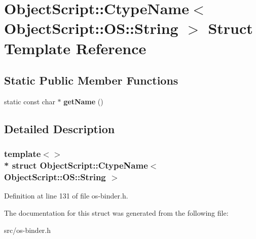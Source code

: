 \hypertarget{struct_object_script_1_1_ctype_name_3_01_object_script_1_1_o_s_1_1_string_01_4}{}\section{Object\+Script\+:\+:Ctype\+Name$<$ Object\+Script\+:\+:OS\+:\+:String $>$ Struct Template Reference}
\label{struct_object_script_1_1_ctype_name_3_01_object_script_1_1_o_s_1_1_string_01_4}
\subsection*{Static Public Member Functions}
\begin{DoxyCompactItemize}
\item 
static const char $\ast$ {\bfseries get\+Name} ()\hypertarget{struct_object_script_1_1_ctype_name_3_01_object_script_1_1_o_s_1_1_string_01_4_a019bd428ab6877af363ef55cc43f35b6}{}\label{struct_object_script_1_1_ctype_name_3_01_object_script_1_1_o_s_1_1_string_01_4_a019bd428ab6877af363ef55cc43f35b6}

\end{DoxyCompactItemize}


\subsection{Detailed Description}
\subsubsection*{template$<$$>$\\*
struct Object\+Script\+::\+Ctype\+Name$<$ Object\+Script\+::\+O\+S\+::\+String $>$}



Definition at line 131 of file os-\/binder.\+h.



The documentation for this struct was generated from the following file\+:\begin{DoxyCompactItemize}
\item 
src/os-\/binder.\+h\end{DoxyCompactItemize}

